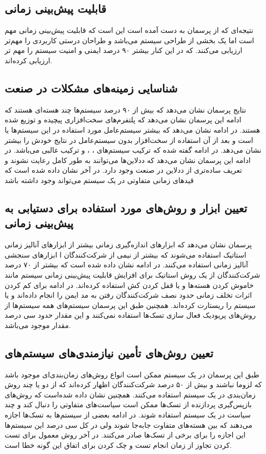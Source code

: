 \documentclass[a4paper, 11pt]{article}
\begin{document}
\subsection{قابلیت پیش‌بینی زمانی}
نتیجه‌ای که از پرسمان به دست آمده است این است که قابلیت پیش‌بینی زمانی مهم است اما یک بخشی
از طراحی سیستم می‌باشد و طراحان درستی کاربردی را مهم‌تر ارزیابی می‌کنند. که در این کنار
بیشتر ۹۰ درصد ایمنی و امنیت سیستم را مهم تر ارزیابی کرده‌اند.

\subsection{شناسایی زمینه‌های مشکلات در صنعت}
نتایج پرسمان نشان می‌دهد که بیش از ۹۰ درصد سیستم‌ها چند‌ هسته‌ای هستند که ادامه این پرسمان نشان
می‌دهد که پلتفرم‌های سخت‌افزاری پیچیده و توزیع‌ شده هستند.
در ادامه نشان می‌دهد که بیشتر سیستم‌عامل مورد استفاده در این سیستم‌ها یا
است و بعد از آن استفاده از سخت‌افزار بدون سیستم‌عامل در نتایج خودش را بیشتر نشان‌ می‌دهد.
در ادامه گفته شده که ترکیب سیستم‌های
،
، و
ترکیب غالبی می‌باشد.
در ادامه این پرسمان نشان می‌دهد که ددلاین‌ها می‌توانند به طور کامل رعایت نشوند و تعریف
ساده‌تری از ددلاین در صنعت وجود دارد.
در آخر نشان داده شده است که قید‌های زمانی متفاوتی در یک سیستم می‌تواند وجود داشته باشد
\subsection{تعیین ابزار و روش‌های مورد استفاده برای دستیابی به پیش‌بینی زمانی}
پرسمان نشان می‌دهد که ابزار‌های اندازه‌گیری زمانی بیشتر از ابزار‌های آنالیز زمانی استاتیک استفاده می‌شوند
که بیشتر از نیمی از شرکت‌کنندگان ا ابزار‌های سنجشی آنالیز زمانی استفاده می‌کنند.
در ادامه نشان داده شده است که بیشتر از ۷۰ درصد شرکت‌کنندگان از یک روش استاتیک برای افزایش
قابلیت پیش‌بینی زمانی سیستم مانند خاموش کردن هسته‌ها و یا قفل کردن کش استفاده کرده‌اند.
در ادامه برای کم کردن اثرات تخلف زمانی حدود نصف شرکت‌کنندگان رفتن به مد ایمن را انجام داده‌اند
و یا سیستم را ریستارت کرده‌اند.
همچنین طبق این پرسمان سیستم‌های
همه سیستم‌ها از روش‌های پریودیک فعال سازی تسک‌ها استفاده نمی‌کنند و این مقدار حدود
سی درصد مقدار موجود می‌باشد.
\subsection{تعیین روش‌های تأمین نیازمندی‌های سیستم‌های 
}
طبق این پرسمان در یک سیستم ممکن است انواع روش‌های زمان‌بندی‌ای موجود باشد که لزوما
نباشند و بیش از ۵۰ درصد شرکت‌کنندگان اظهار کرده‌اند که از دو یا چند روش زمان‌بندی در یک سیستم
استفاده می‌کنند.
همچنین نشان داده شده‌است که روش‌های بازپس‌گیری پردازنده از تسک‌ها ممکن است سیاست‌های
متفاوتی را دنبال کند و چند سیاست در یک سیستم استفاده شوند.
در ادامه بعضی از سیستم‌ها به تسک‌ها اجازه می‌دهند که بین هسته‌های متفاوت جابه‌جا شوند ولی در کل
سی درصد این سیستم‌ها این اجازه را برای برخی از تسک‌ها صادر می‌کنند.
در آخر روش معمول برای تست کردن تجاوز از زمان انجام تست‌ و چک کردن برای اتفاق این گونه خطا
است.
\end{document}
